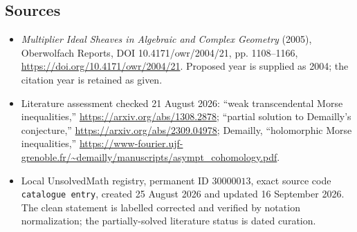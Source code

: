 \documentclass[11pt]{article}
\begin{document}
\subsection{Sources}
\begin{itemize}
\item \emph{Multiplier Ideal Sheaves in Algebraic and Complex Geometry} (2005), Oberwolfach Reports, DOI 10.4171/owr/2004/21, pp. 1108--1166, \url{https://doi.org/10.4171/owr/2004/21}. Proposed year is supplied as 2004; the citation year is retained as given.
\item Literature assessment checked 21 August 2026: ``weak transcendental Morse inequalities,'' \url{https://arxiv.org/abs/1308.2878}; ``partial solution to Demailly's conjecture,'' \url{https://arxiv.org/abs/2309.04978}; Demailly, ``holomorphic Morse inequalities,'' \url{https://www-fourier.ujf-grenoble.fr/~demailly/manuscripts/asympt_cohomology.pdf}.
\item Local UnsolvedMath registry, permanent ID $30000013$, exact source code \texttt{catalogue entry}, created 25 August 2026 and updated 16 September 2026. The clean statement is labelled corrected and verified by notation normalization; the partially-solved literature status is dated curation.
\end{itemize}
\end{document}
